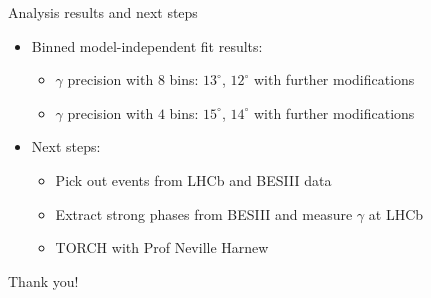 \documentclass{beamer}
\begin{document}
\begin{frame}{Analysis results and next steps}
  \begin{itemize}
    \item{Binned model-independent fit results:}
    \begin{itemize}
      \item{$\gamma$ precision with $8$ bins: $13^\circ$, $12^\circ$ with further modifications}
      \item{$\gamma$ precision with $4$ bins: $15^\circ$, $14^\circ$ with further modifications}
    \end{itemize}
    \item{Next steps:}
    \begin{itemize}
      \item{Pick out events from LHCb and BESIII data}
      \item{Extract strong phases from BESIII and measure $\gamma$ at LHCb}
      \item{TORCH with Prof Neville Harnew}
    \end{itemize}
  \end{itemize}
  \vspace{1cm}
  \begin{center}
    Thank you!
  \end{center}
\end{frame}
\end{document}
